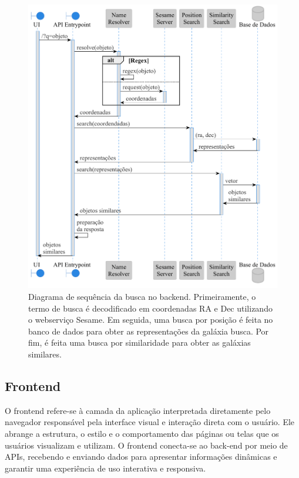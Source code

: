 \begin{figure}[!ht]
  \centering
  \includegraphics[width=\linewidth]{diagrams/plots/sequence_back.pdf}
  \caption{Diagrama de sequência da busca no backend. Primeiramente, o termo de busca é decodificado em coordenadas RA e Dec utilizando o webserviço Sesame. Em seguida, uma busca por posição é feita no banco de dados para obter as representações da galáxia busca. Por fim, é feita uma busca por similaridade para obter as galáxias similares.}
  \label{fig:seq-back}
\end{figure}






\subsection{Frontend}
\label{sec:si-frontend}

O frontend refere-se à camada da aplicação interpretada diretamente pelo navegador responsável pela interface visual e interação direta com o usuário. Ele abrange a estrutura, o estilo e o comportamento das páginas ou telas que os usuários visualizam e utilizam. O frontend conecta-se ao back-end por meio de APIs, recebendo e enviando dados para apresentar informações dinâmicas e garantir uma experiência de uso interativa e responsiva.


